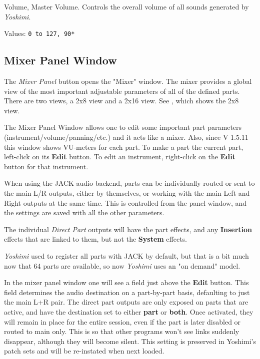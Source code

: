    Volume, Master Volume.
   Controls the overall volume of all sounds generated by
   \textsl{Yoshimi}.

   Values: \texttt{0 to 127, 90*}

\subsection{Mixer Panel Window}
\label{subsec:mixer_panel_window}

   The \textsl{Mixer Panel} button opens the "Mixer" window.
   The mixer provides a global view of the most important
   adjustable parameters of all of the defined parts.
   There are two views, a 2x8 view and a 2x16 view.
   See , which
   shows the 2x8 view.

   The Mixer Panel Window allows one to edit some important part parameters
   (instrument/volume/panning/etc.) and it acts like a mixer. Also, since
   V 1.5.11 this window shows VU-meters for each part.
   To make a part the current part, left-click on its \textbf{Edit} button.
   To edit an instrument, right-click on the \textbf{Edit} button for that
   instrument.

   When using the JACK audio backend, parts can be individually routed or sent
   to the main L/R outputs, either by themselves, or working with the main Left
   and Right outputs at the same time.  This is controlled from the panel
   window, and the settings are saved with all the other parameters.

   The individual \textsl{Direct Part} outputs will have the part effects, and any
   \textbf{Insertion} effects that are linked to them, but not the
   \textbf{System} effects.

   \textsl{Yoshimi} used to register all parts with JACK by default, but that
   is a bit much now that 64 parts are available, so now \textsl{Yoshimi}
   uses an "on demand" model.

   In the mixer panel window one will see a field just above the
   \textbf{Edit} button.
   This field determines the audio destination on a part-by-part basis,
   defaulting to just the main L+R pair. The direct part outputs are only
   exposed on parts that are active, and have the destination set to either
   \textbf{part} or \textbf{both}.
   Once activated, they will remain in place for the entire session, even if
   the part is later disabled or routed to main only. This is so that other
   programs won't see links suddenly disappear, although they will become
   silent.  This setting is preserved in Yoshimi's patch sets and will be
   re-instated when next loaded.


